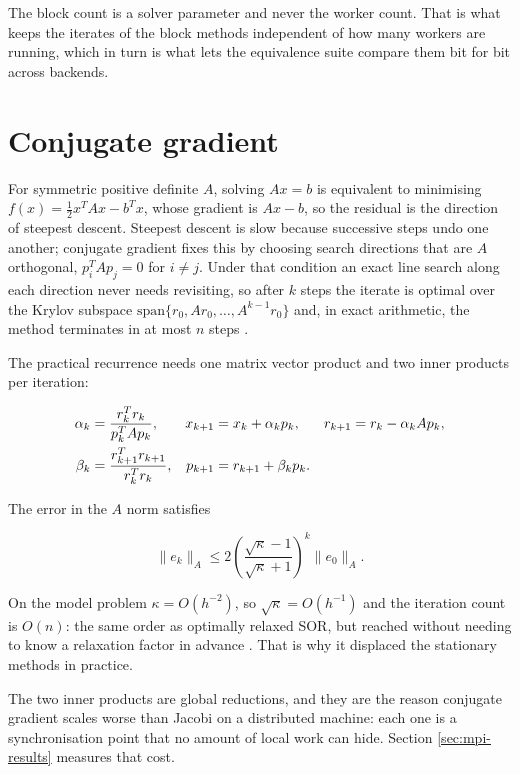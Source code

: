 The block count is a solver parameter and never the worker count. That is what
keeps the iterates of the block methods independent of how many workers are
running, which in turn is what lets the equivalence suite compare them bit for
bit across backends.

\section{Conjugate gradient}

For symmetric positive definite $A$, solving $Ax = b$ is equivalent to
minimising $f(x) = \tfrac{1}{2}x^{T}Ax - b^{T}x$, whose gradient is $Ax - b$, so
the residual is the direction of steepest descent. Steepest descent is slow
because successive steps undo one another; conjugate gradient fixes this by
choosing search directions that are $A$ orthogonal, $p_i^{T} A p_j = 0$ for
$i \neq j$. Under that condition an exact line search along each direction never
needs revisiting, so after $k$ steps the iterate is optimal over the Krylov
subspace $\mathrm{span}\{r_0, Ar_0, \dots, A^{k-1}r_0\}$ and, in exact
arithmetic, the method terminates in at most $n$ steps \cite{shewchuk1994}.

The practical recurrence needs one matrix vector product and two inner products
per iteration:

\begin{align}
  \alpha_k   &= \frac{r_k^{T} r_k}{p_k^{T} A p_k}, &
  x_{k+1}    &= x_k + \alpha_k p_k, &
  r_{k+1}    &= r_k - \alpha_k A p_k, \notag \\
  \beta_k    &= \frac{r_{k+1}^{T} r_{k+1}}{r_k^{T} r_k}, &
  p_{k+1}    &= r_{k+1} + \beta_k p_k. &&
  \label{eq:cg}
\end{align}

The error in the $A$ norm satisfies

\begin{equation}
  \|e_k\|_A \le 2\left(\frac{\sqrt{\kappa}-1}{\sqrt{\kappa}+1}\right)^{k}\|e_0\|_A .
  \label{eq:cg-bound}
\end{equation}

On the model problem $\kappa = O(h^{-2})$, so $\sqrt{\kappa} = O(h^{-1})$ and the
iteration count is $O(n)$: the same order as optimally relaxed SOR, but reached
without needing to know a relaxation factor in advance \cite[Ch.~6]{saad2003}.
That is why it displaced the stationary methods in practice.

The two inner products are global reductions, and they are the reason conjugate
gradient scales worse than Jacobi on a distributed machine: each one is a
synchronisation point that no amount of local work can hide. Section
\ref{sec:mpi-results} measures that cost.

